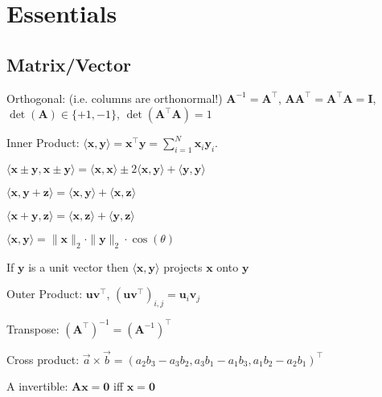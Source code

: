 \section{Essentials}
\subsection*{Matrix/Vector}
\begin{compactdesc}
	\item[Orthogonal:] (i.e. columns are orthonormal!) $\mathbf{A}^{-1} = \mathbf{A}^\top$, $\mathbf{A} \mathbf{A}^\top = \mathbf{A}^\top \mathbf{A} = \mathbf{I}$, $\operatorname{det}(\mathbf{A}) \in \{+1, -1\}$, $\operatorname{det}(\mathbf{A}^\top \mathbf{A}) = 1$
	\item[Inner Product:] $\langle \mathbf{x}, \mathbf{y} \rangle = \mathbf{x}^\top \mathbf{y} = \sum_{i=1}^{N} \mathbf{x}_i \mathbf{y}_i$.
	\begin{inparaitem}
		\item $\langle \mathbf{x} \pm \mathbf{y}, \mathbf{x} \pm \mathbf{y} \rangle = \langle \mathbf{x}, \mathbf{x} \rangle \pm 2 \langle \mathbf{x}, \mathbf{y} \rangle + \langle \mathbf{y}, \mathbf{y} \rangle$
		\item $\langle \mathbf{x}, \mathbf{y} + \mathbf{z} \rangle = \langle \mathbf{x}, \mathbf{y} \rangle + \langle \mathbf{x}, \mathbf{z} \rangle$
		\item $\langle \mathbf{x} + \mathbf{y}, \mathbf{z} \rangle = \langle \mathbf{x}, \mathbf{z} \rangle + \langle \mathbf{y}, \mathbf{z} \rangle$
		\item $\langle \mathbf{x}, \mathbf{y} \rangle = \|\mathbf{x}\|_2 \cdot \|\mathbf{y}\|_2 \cdot \cos(\theta)$
		\item If $\mathbf{y}$ is a unit vector then $\langle \mathbf{x}, \mathbf{y} \rangle$ projects $\mathbf{x}$ onto $\mathbf{y}$
	\end{inparaitem}
	\item[Outer Product:] $\mathbf{u} \mathbf{v}^\top$, $(\mathbf{u} \mathbf{v}^\top)_{i, j} = \mathbf{u}_i \mathbf{v}_j$
	\item[Transpose:] $(\mathbf{A}^\top)^{-1} = (\mathbf{A}^{-1})^\top$
	\item[Cross product:] $\vec{a}\times\vec{b}=(a_2b_3-a_3b_2, a_3b_1-a_1b_3, a_1b_2-a_2b_1)^\top$
    \item[A invertible:] $\mathbf{A}\mathbf{x} = \mathbf{0}$ iff $\mathbf{x} = \mathbf{0}$
\end{compactdesc}


